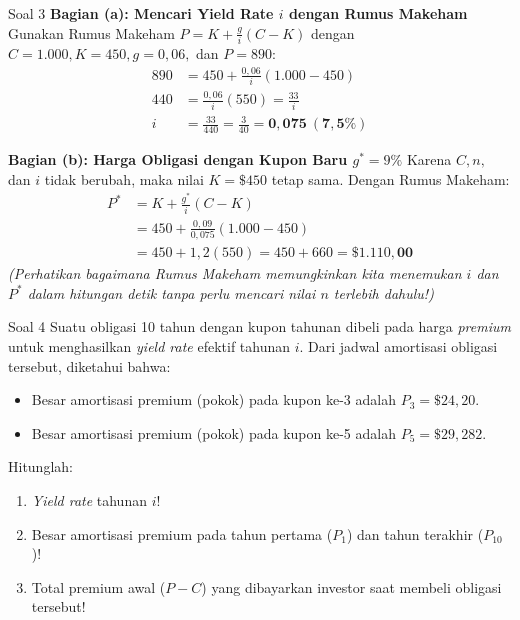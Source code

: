 \documentclass[11pt,a4paper]{article}
\begin{document}
\begin{solutionbox}{Soal 3}
\textbf{Bagian (a): Mencari Yield Rate $i$ dengan Rumus Makeham}
Gunakan Rumus Makeham $P = K + \frac{g}{i}(C - K)$ dengan $C = 1.000, K = 450, g = 0{,}06,$ dan $P = 890$:
\begin{align*}
    890 &= 450 + \frac{0{,}06}{i}(1.000 - 450) \\[0.3em]
    440 &= \frac{0{,}06}{i}(550) = \frac{33}{i} \\[0.3em]
    i &= \frac{33}{440} = \frac{3}{40} = \mathbf{0{,}075 \ (7{,}5\%)}
\end{align*}

\textbf{Bagian (b): Harga Obligasi dengan Kupon Baru $g^* = 9\%$}
Karena $C, n,$ dan $i$ tidak berubah, maka nilai $K = \$450$ tetap sama. Dengan Rumus Makeham:
\begin{align*}
    P^* &= K + \frac{g^*}{i}(C - K) \\[0.3em]
        &= 450 + \frac{0{,}09}{0{,}075}(1.000 - 450) \\[0.3em]
        &= 450 + 1{,}2(550) = 450 + 660 = \mathbf{\$1.110{,}00}
\end{align*}
\textit{(Perhatikan bagaimana Rumus Makeham memungkinkan kita menemukan $i$ dan $P^*$ dalam hitungan detik tanpa perlu mencari nilai $n$ terlebih dahulu!)}
\end{solutionbox}

\vspace{1.2em}

\begin{problembox}{Soal 4}
Suatu obligasi 10 tahun dengan kupon tahunan dibeli pada harga \textit{premium} untuk menghasilkan \textit{yield rate} efektif tahunan $i$. Dari jadwal amortisasi obligasi tersebut, diketahui bahwa:
\begin{itemize}
    \item Besar amortisasi premium (pokok) pada kupon ke-3 adalah $P_3 = \$24{,}20$.
    \item Besar amortisasi premium (pokok) pada kupon ke-5 adalah $P_5 = \$29{,}282$.
\end{itemize}
Hitunglah:
\begin{enumerate}[label=(\alph*)]
    \item \textit{Yield rate} tahunan $i$!
    \item Besar amortisasi premium pada tahun pertama ($P_1$) dan tahun terakhir ($P_{10}$)!
    \item Total premium awal ($P - C$) yang dibayarkan investor saat membeli obligasi tersebut!
\end{enumerate}
\end{problembox}
\end{document}
